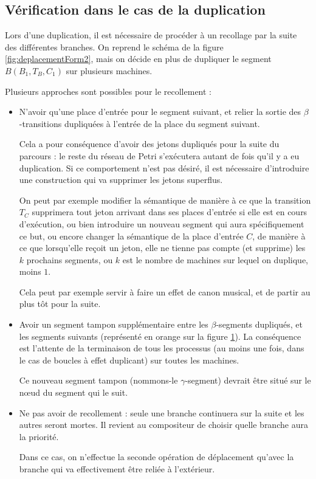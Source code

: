 \subsection{Vérification dans le cas de la duplication}
\label{section:synchroPetri}
Lors d'une duplication, il est nécessaire de procéder à un recollage par la suite des différentes branches. On reprend le schéma de la figure \ref{fig:deplacementForm2}, mais on décide en plus de dupliquer le segment $B(B_1, T_B, C_1)$ sur plusieurs machines.

Plusieurs approches sont possibles pour le recollement : 
\begin{itemize}
\item N'avoir qu'une place d'entrée pour le segment suivant, et relier la sortie des $\beta$-transitions dupliquées à l'entrée de la place du segment suivant.

Cela a pour conséquence d'avoir des jetons dupliqués pour la suite du parcours : le reste du réseau de Petri s'exécutera autant de fois qu'il y a eu duplication. Si ce comportement n'est pas désiré, il est nécessaire d'introduire une construction qui va supprimer les jetons superflus. 

On peut par exemple modifier la sémantique de manière à ce que la transition $T_C$ supprimera tout jeton arrivant dans ses places d'entrée si elle est en cours d'exécution, ou bien introduire un nouveau segment qui aura spécifiquement ce but, ou encore changer la sémantique de la place d'entrée $C$, de manière à ce que lorsqu'elle reçoit un jeton, elle ne tienne pas compte (et supprime) les $k$ prochains segments, ou $k$ est le nombre de machines sur lequel on duplique, moins $1$.

Cela peut par exemple servir à faire un effet de canon musical, et de partir au plus tôt pour la suite.

\item Avoir un segment tampon supplémentaire entre les $\beta$-segments dupliqués, et les segments suivants (représenté en orange sur la figure \ref{fig.duplicationEtRecoll}).
La conséquence est l'attente de la terminaison de tous les processus (au moins une fois, dans le cas de boucles à effet duplicant) sur toutes les machines.

Ce nouveau segment tampon (nommons-le $\gamma$-segment) devrait être situé sur le nœud du segment qui le suit.
\item Ne pas avoir de recollement : seule une branche continuera sur la suite et les autres seront mortes. Il revient au compositeur de choisir quelle branche aura la priorité.

Dans ce cas, on n'effectue la seconde opération de déplacement qu'avec la branche qui va effectivement être reliée à l'extérieur.
\end{itemize}

\begin{figure}[h!]
\centering

\label{fig.duplicationEtRecoll}
\end{figure}
